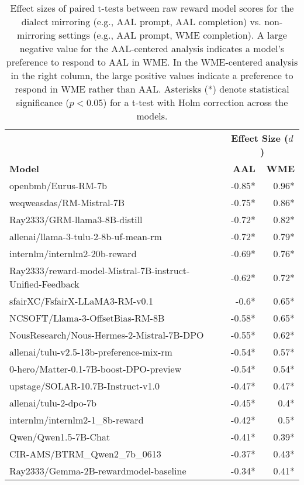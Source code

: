 \begin{table*}[ht]
\small
\centering
\begin{tabular}{lrr}
\toprule
& \multicolumn{2}{c}{\textbf{Effect Size ($d$)}} \\
\cmidrule(lr){2-3}
\textbf{Model} & \textbf{AAL} & \textbf{WME} \\
\midrule
openbmb/Eurus-RM-7b & -0.85* & 0.96* \\
weqweasdas/RM-Mistral-7B & -0.75* & 0.86* \\
Ray2333/GRM-llama3-8B-distill & -0.72* & 0.82* \\
allenai/llama-3-tulu-2-8b-uf-mean-rm & -0.72* & 0.79* \\
internlm/internlm2-20b-reward & -0.69* & 0.76* \\
Ray2333/reward-model-Mistral-7B-instruct-Unified-Feedback & -0.62* & 0.72* \\
sfairXC/FsfairX-LLaMA3-RM-v0.1 & -0.6* & 0.65* \\
NCSOFT/Llama-3-OffsetBias-RM-8B & -0.58* & 0.65* \\
NousResearch/Nous-Hermes-2-Mistral-7B-DPO & -0.55* & 0.62* \\
allenai/tulu-v2.5-13b-preference-mix-rm & -0.54* & 0.57* \\
0-hero/Matter-0.1-7B-boost-DPO-preview & -0.54* & 0.54* \\
upstage/SOLAR-10.7B-Instruct-v1.0 & -0.47* & 0.47* \\
allenai/tulu-2-dpo-7b & -0.45* & 0.4* \\
internlm/internlm2-1\_8b-reward & -0.42* & 0.5* \\
Qwen/Qwen1.5-7B-Chat & -0.41* & 0.39* \\
CIR-AMS/BTRM\_Qwen2\_7b\_0613 & -0.37* & 0.43* \\
Ray2333/Gemma-2B-rewardmodel-baseline & -0.34* & 0.41* \\
\hline
\end{tabular}
\caption{Effect sizes of paired t-tests between raw reward model scores for the dialect mirroring (e.g., AAL prompt, AAL completion) vs. non-mirroring settings (e.g., AAL prompt, WME completion). A large negative value for the AAL-centered analysis indicates a model's preference to respond to AAL in WME. In the WME-centered analysis in the right column, the large positive values indicate a preference to respond in WME rather than AAL. Asterisks (*) denote statistical significance ($p < 0.05$) for a t-test with Holm correction across the models.}
\label{tab:rq3}
\end{table*}

